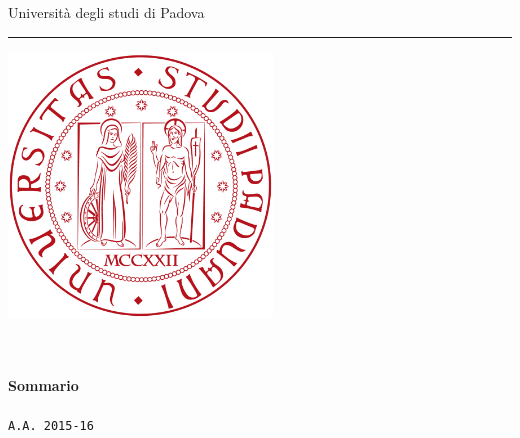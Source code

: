 \begin{titlepage}
	\begin{center}
     {\Large {Università degli studi di Padova}}\\
     \vspace{1em}
		 \hrule
		 \vspace{4em}
     \includegraphics[width=7cm]{../template/icone/logo.png}\\
		 \vspace{4em}
     {\huge \textbf{\documenttitle}}\\
		 \vspace{1em}
		 {\Large {\documentsubtitle}}\\
     \vspace{2em}

	\end{center}
	

	\vspace{2em}
	\begin{center}
		{\large \textbf{Sommario}}\\
	    
	    \vspace{1em}\\
		\texttt{A.A. 2015-16}\\
	\end{center}

\end{titlepage}
